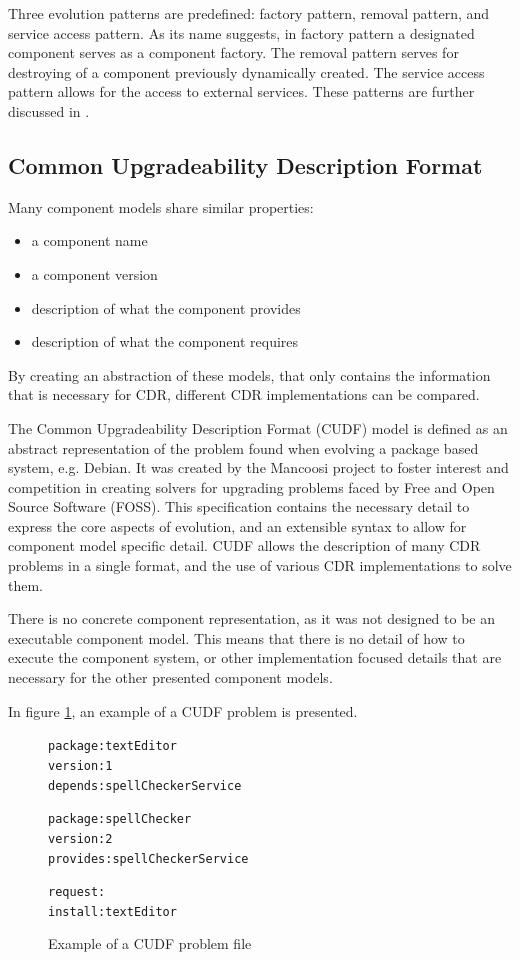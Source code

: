 Three evolution patterns are predefined: factory pattern, removal pattern, and service access pattern.
As its name suggests, in factory pattern a designated component serves as a component factory. 
The removal pattern serves for destroying of a component previously dynamically created.
The service access pattern allows for the access to external services.
These patterns are further discussed in \cite{Hnetynka2006}.


\subsection{Common Upgradeability Description Format}
Many component models share similar properties:
\begin{itemize}
  \item a component name
  \item a component version
  \item description of what the component provides
  \item description of what the component requires
\end{itemize} 

By creating an abstraction of these models, that only contains the information that is necessary for CDR, different CDR implementations can be compared.

The Common Upgradeability Description Format (CUDF) model is defined as an abstract representation of the problem found when evolving a package based system, e.g. Debian.
It was created by the Mancoosi project to foster interest and competition in creating solvers for upgrading problems faced by Free and Open Source Software (FOSS).
This specification contains the necessary detail to express the core aspects of evolution, and an extensible syntax to allow for component model specific detail. 
CUDF allows the description of many CDR problems in a single format, and the use of various CDR implementations to solve them. 

There is no concrete component representation, as it was not designed to be an executable component model.
This means that there is no detail of how to execute the component system, or other implementation focused details that are necessary for the other presented component models.

In figure \ref{CUDFmetadata}, an example of a CUDF problem is presented.

\begin{figure}[htp] 
\begin{center}
\begin{alltt}
package: textEditor
version: 1
depends: spellCheckerService

package: spellChecker
version: 2
provides: spellCheckerService

request:
install:textEditor

\end{alltt}
  \caption[CUDF meta-data file]{Example of a CUDF problem file}
  \label{CUDFmetadata}
\end{center}
\end{figure}

